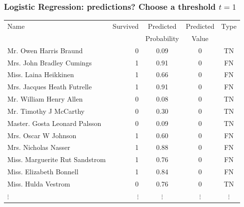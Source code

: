 \documentclass[aspectratio=169]{beamer}
\theoremstyle{principle}
\begin{document}
\begin{frame}
\frametitle{Logistic Regression: predictions?  Choose a threshold $t = 1$}

\begin{table}[ht]
\centering
\begin{tabular}{l | r | c | c | c}

 Name & Survived & Predicted & Predicted & Type\\ 
&&Probability&Value\\
  \hline
  \hline
 Mr. Owen Harris Braund &   0 & 0.09 & 0 & TN\\ 
 Mrs. John Bradley Cumings &   1 & 0.91 & 0 & FN\\ 
 Miss. Laina Heikkinen &   1 & 0.66 & 0 & FN\\ 
 Mrs. Jacques Heath Futrelle &   1 & 0.91 & 0 & FN\\ 
 Mr. William Henry Allen &   0 & 0.08 & 0 & TN\\ 
 Mr. Timothy J McCarthy &   0 & 0.30 & 0 & TN\\ 
 Master. Gosta Leonard Palsson &   0 & 0.09 & 0 & TN\\ 
 Mrs. Oscar W Johnson &   1 & 0.60 & 0 & FN\\ 
 Mrs. Nicholas Nasser &   1 & 0.88 & 0 & FN\\ 
 Miss. Marguerite Rut Sandstrom &   1 & 0.76 & 0 & FN\\ 
 Miss. Elizabeth Bonnell &   1 & 0.84 &0 & FN\\ 
 Miss. Hulda Vestrom &   0 & 0.76 &0 & TN\\ 
$\vdots$ & $\vdots$ & $\vdots$ & $\vdots$ & $\vdots$
\end{tabular}
\end{table}

\end{frame}
\end{document}

